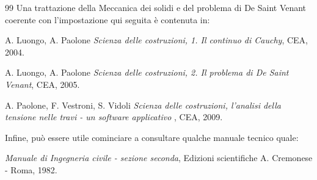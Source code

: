 \begin{thebibliography}{99}
\vspace{0.5 cm} \noindent Una trattazione della Meccanica
dei solidi e del problema di De Saint Venant coerente con l'impostazione qui seguita \`{e}
contenuta in:

A. Luongo, A. Paolone {\em Scienza delle costruzioni, 1. Il
continuo di Cauchy}, CEA, 2004.

A. Luongo, A. Paolone {\em Scienza delle costruzioni, 2. Il
problema di De Saint Venant}, CEA, 2005.

A. Paolone, F. Vestroni, S. Vidoli {\em Scienza delle costruzioni,  l'analisi della tensione nelle travi - un software applicativo }, CEA, 2009.

Infine, può essere utile cominciare a consultare qualche manuale tecnico quale:

{\em Manuale di Ingegneria civile - sezione seconda}, Edizioni scientifiche A. Cremonese - Roma, 1982.



\end{thebibliography}
